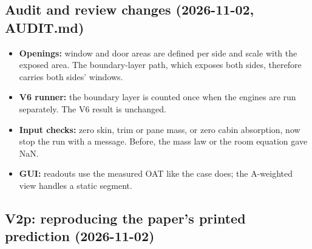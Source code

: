 \documentclass[10pt,a4paper]{article}
\begin{document}
\subsection*{Audit and review changes (2026-11-02, AUDIT.md)}

\begin{itemize}
\item \textbf{Openings:} window and door areas are defined per side and scale with the exposed area. The boundary-layer path, which exposes both sides, therefore carries both sides' windows.
\item \textbf{V6 runner:} the boundary layer is counted once when the engines are run separately. The V6 result is unchanged.
\item \textbf{Input checks:} zero skin, trim or pane mass, or zero cabin absorption, now stop the run with a message. Before, the mass law or the room equation gave NaN.
\item \textbf{GUI:} readouts use the measured OAT like the case does; the A-weighted view handles a static segment.
\end{itemize}

\subsection*{V2p: reproducing the paper's printed prediction (2026-11-02)}
\end{document}
